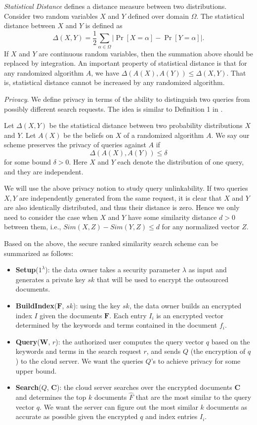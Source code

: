 \documentclass{article}
\begin{document}
\emph{Statistical Distance} \cite{AB09,G95} defines a distance measure between two distributions. Consider two random variables $X$ and $Y$ defined over domain $\Omega$. The statistical distance between $X$ and $Y$ is defined as
$$\Delta(X,Y) = \frac{1}{2}\sum_{\alpha\in\Omega} |\Pr[X=\alpha] - \Pr[Y=\alpha]|.$$
If $X$ and $Y$ are continuous random variables, then the summation above should be replaced by integration.
An important property of statistical distance is that for any randomized algorithm $A$, we have $\Delta(A(X),A(Y))\leq\Delta(X,Y)$. That is, statistical distance cannot be increased by any randomized algorithm.

\emph{Privacy}. We define privacy in terms of the ability to distinguish two queries from possibly different search requests. The idea is similar to Definition 1 in \cite{K09}.
\begin{definition}
Let $\Delta(X, Y)$ be the statistical distance between two probability distributions $X$ and $Y$. Let $A(X)$ be the beliefs on $X$ of a randomized algorithm $A$. We say our scheme preserves the privacy of queries against $A$ if
$$\Delta(A(X), A(Y)) \leq \delta$$
for some bound $\delta > 0$. Here $X$ and $Y$ each denote the distribution of one query, and they are independent.
\end{definition}
We will use the above privacy notion to study query unlinkability. 
If two queries $X, Y$ are independently generated from the same request, it is clear that $X$ and $Y$ are also identically distributed, and thus their distance is zero. Hence we only need to consider the case when $X$ and $Y$ have some similarity distance $d>0$ between them, i.e., $Sim(X, Z) - Sim(Y,Z) \leq d$ for any normalized vector $Z$.

Based on the above, the secure ranked similarity search scheme can be summarized as follows:
\begin{itemize}
\item \textbf{Setup}($1^\lambda$): the data owner takes a security parameter $\lambda$ as input and generates a private key $sk$ that will be used to encrypt the outsourced documents.
\item \textbf{BuildIndex}($\mathbf{F}$, $sk$): using the key $sk$, the data owner builds an encrypted index $I$ given the documents $\mathbf{F}$. Each entry $I_i$ is an encrypted vector determined by the keywords and terms contained in the document $f_i$.
\item \textbf{Query}($\mathbf{W}$, $r$): the authorized user computes the query vector $q$ based on the keywords and terms in the search request $r$, and sends $Q$ (the encryption of $q$) to the cloud server. We want the queries $Q$'s to achieve privacy for some upper bound.
\item \textbf{Search}($Q$, $\mathbf{C}$): the cloud server searches over the encrypted documents $\mathbf{C}$ and determines the top $k$ documents $\hat{F}$ that are the most similar to the query vector $q$. We want the server can figure out the most similar $k$ documents as accurate as possible given the encrypted $q$ and index entries $I_i$.
\end{itemize}
\end{document}
